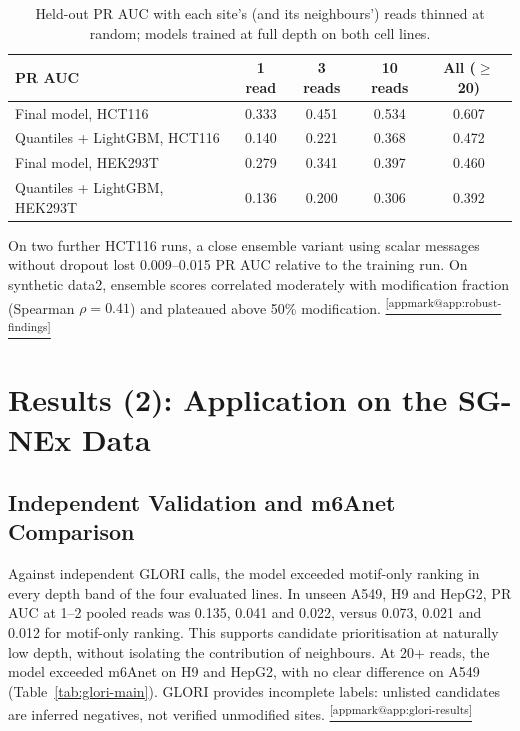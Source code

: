 \documentclass[11pt,a4paper]{article}
\makeatletter
\DeclareRobustCommand{\applink}[1]{%
    \hyperref[#1]{\textsuperscript{\ref*{appmark@#1}}}}
\makeatother
\begin{document}
\begin{table}[H]
    \centering\small
    \begin{tabular}{lcccc}
        \toprule
        \textbf{PR AUC} & \textbf{1 read} & \textbf{3 reads} & \textbf{10 reads} & \textbf{All ($\ge$20)} \\
        \midrule
        Final model, HCT116 & 0.333 & 0.451 & 0.534 & 0.607 \\
        Quantiles + LightGBM, HCT116 & 0.140 & 0.221 & 0.368 & 0.472 \\
        Final model, HEK293T & 0.279 & 0.341 & 0.397 & 0.460 \\
        Quantiles + LightGBM, HEK293T & 0.136 & 0.200 & 0.306 & 0.392 \\
        \bottomrule
    \end{tabular}
    \caption{Held-out PR AUC with each site's (and its neighbours') reads
    thinned at random; models trained at full depth on both cell lines.}
    \label{tab:depth}
\end{table}

On two further HCT116 runs, a close ensemble variant using scalar messages
without dropout lost 0.009--0.015 PR AUC relative to the training run.
On synthetic data2, ensemble scores correlated moderately
with modification fraction (Spearman $\rho=0.41$) and
plateaued above 50\% modification.\applink{app:robust-findings}

\section{Results (2): Application on the SG-NEx Data}
\label{sec:sgnex-results}
\subsection{Independent Validation and m6Anet Comparison}
Against independent GLORI calls, the model exceeded motif-only ranking in
every depth band of the four evaluated lines. In unseen A549, H9 and HepG2,
PR AUC at 1--2 pooled reads was 0.135, 0.041 and 0.022, versus 0.073, 0.021
and 0.012 for motif-only ranking. This supports candidate prioritisation at
naturally low depth, without isolating the contribution of neighbours.
At 20+ reads, the model exceeded m6Anet on H9 and HepG2, with no clear
difference on A549 (Table~\ref{tab:glori-main}). GLORI provides incomplete
labels: unlisted candidates are inferred negatives, not verified unmodified
sites.\applink{app:glori-results}
\end{document}
